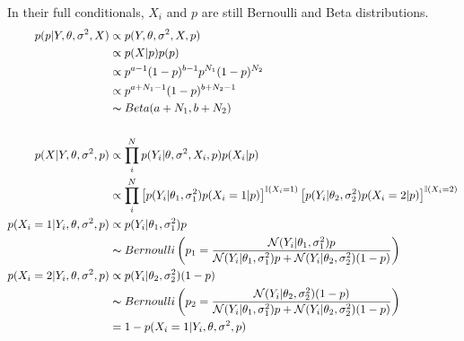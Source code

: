 \documentclass[11pt, letterpaper]{article}
\begin{document}
In their full conditionals, $X_i$ and $p$ are still Bernoulli and Beta distributions.
\begin{align*}
    p(p|Y, \theta, \sigma^2, X) &\propto p(Y, \theta, \sigma^2, X, p) \\
        &\propto p(X|p)p(p) \\
        &\propto p^{a-1}(1-p)^{b-1} p^{N_1}(1-p)^{N_2} \\
        &\propto p^{a+N_1-1}(1-p)^{b+N_2-1} \\
        &\thicksim Beta(a+N_1, b+N_2) \\ \\
    p(X|Y, \theta, \sigma^2, p) &\propto \prod_i^N p(Y_i|\theta, \sigma^2, X_i, p) p(X_i|p) \\
        &\propto \prod_i^N
            \left[p(Y_i|\theta_1, \sigma^2_1) p(X_i=1|p)\right]^{\mathbb{I}(X_i=1)}
            \left[p(Y_i|\theta_2, \sigma^2_2) p(X_i=2|p)\right]^{\mathbb{I}(X_i=2)} \\
    p(X_i=1|Y_i, \theta, \sigma^2, p) &\propto p(Y_i|\theta_1, \sigma^2_1) p \\
        &\thicksim Bernoulli\left(
            p_1 = 
            \frac{\mathcal{N}(Y_i|\theta_1, \sigma^2_1) p}
                 {\mathcal{N}(Y_i|\theta_1, \sigma^2_1) p + \mathcal{N}(Y_i|\theta_2, \sigma^2_2) (1-p)}
        \right) \\
    p(X_i=2|Y_i, \theta, \sigma^2, p) &\propto p(Y_i|\theta_2, \sigma^2_2) (1-p) \\
        &\thicksim Bernoulli\left(
            p_2 = 
            \frac{\mathcal{N}(Y_i|\theta_2, \sigma^2_2) (1-p)}
                 {\mathcal{N}(Y_i|\theta_1, \sigma^2_1) p + \mathcal{N}(Y_i|\theta_2, \sigma^2_2) (1-p)}
        \right) \\
        &= 1 - p(X_i=1|Y_i, \theta, \sigma^2, p)
\end{align*}
\end{document}

